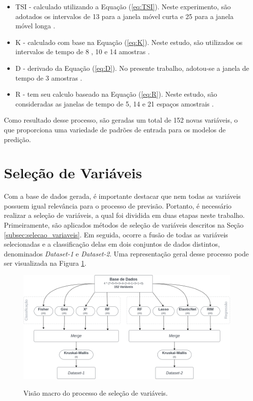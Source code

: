 \begin{itemize}
    \item \ac{TSI} - calculado utilizando a Equação (\ref{eq:TSI}). Neste experimento, são adotados os intervalos de 13 para a janela móvel curta e 25 para a janela móvel longa \cite{nayak2015naive, anwar2019forecasting}.
    
    \item \ac{K} - calculado com base na Equação (\ref{eq:K}). Neste estudo, são utilizados os intervalos de tempo de 8 \cite{ni2022does}, 10 \cite{ijegwa2014predictive} e 14 amostras \cite{C_Veeramani_Exploration}.
    
    \item \ac{D} - derivado da Equação (\ref{eq:D}). No presente trabalho, adotou-se a janela de tempo de 3 amostras \cite{ijegwa2014predictive, vaidya2018stochastic}.
    
    \item \ac{R} - tem seu calculo baseado na Equação (\ref{eq:R}). Neste estudo, são consideradas as janelas de tempo de 5, 14 e 21 espaços amostrais \cite{de2016multi}.
    
\end{itemize}
Como resultado desse processo, são geradas um total de 152 novas variáveis, o que proporciona uma variedade de padrões de entrada para os modelos de predição.



\section{Seleção de Variáveis}
\label{sec:selecao_variaveis}
Com a base de dados gerada, é importante destacar que nem todas as variáveis possuem igual relevância para o processo de previsão. Portanto, é necessário realizar a seleção de variáveis, a qual foi dividida em duas etapas neste trabalho. Primeiramente, são aplicados métodos de seleção de variáveis descritos na Seção \ref{subsec:selecao_variaveis}. Em seguida, ocorre a fusão de todas as variáveis selecionadas e a classificação delas em dois conjuntos de dados distintos, denominados \textit{Dataset-1} e \textit{Dataset-2}. Uma representação geral desse processo pode ser visualizada na Figura \ref{fig:feature_selection}.

\begin{figure}[htbp]
    \caption{Visão macro do processo de seleção de variáveis.}
      \centering
    \includegraphics[width=.99\linewidth]{sections/images/feature_selection.png} 
    \label{fig:feature_selection}
\end{figure}

